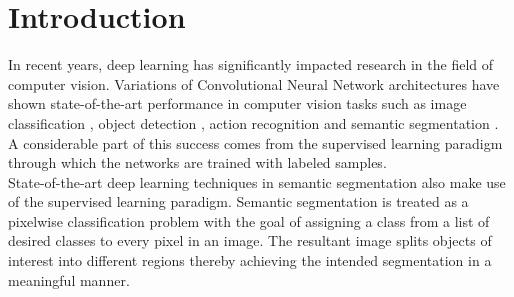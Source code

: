 \documentclass[a4paper,12pt]{article}
\begin{document}
\newpage
\section{Introduction}
\hspace{8mm}In recent years, deep learning has significantly impacted research in the field of computer vision. Variations of Convolutional Neural Network architectures have shown state-of-the-art performance in computer vision tasks such as image classification \cite{1}, object detection \cite{2}, action recognition \cite{3} and semantic segmentation \cite{4}. A considerable part of this success comes from the supervised learning paradigm through which the networks are trained with labeled samples.\\

State-of-the-art deep learning techniques in semantic segmentation also make use of the supervised learning paradigm. Semantic segmentation is treated as a pixelwise classification problem with the goal of assigning a class from a list of desired classes to every pixel in an image. The resultant image splits objects of interest into different regions thereby achieving the intended segmentation in a meaningful manner.\\
\end{document}
